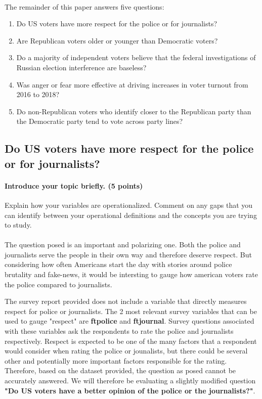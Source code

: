 \documentclass[12pt]{article}
\begin{document}
\paragraph{}
The remainder of this paper answers five questions:
\begin{enumerate}
\item Do US voters have more respect for the police or for journalists?
\item Are Republican voters older or younger than Democratic voters?
\item Do a majority of independent voters believe that the federal investigations of Russian election interference are baseless?
\item Was anger or fear more effective at driving increases in voter turnout from 2016 to 2018?
\item Do non-Republican voters who identify closer to the Republican party than the Democratic party tend to vote across party lines?
\end{enumerate}

\subsection{Do US voters have more respect for the police or for journalists?}
\paragraph{Introduce your topic briefly. (5 points)}
Explain how your variables are operationalized. Comment on any gaps that you can identify between your operational definitions and the concepts you are trying to study.

\paragraph{}
The question posed is an important and polarizing one. Both the police and journalists serve the people in their own way and therefore deserve respect. But considering how often Americans start the day with stories around police brutality and fake-news, it would be intersting to gauge how american voters rate the police compared to journalists. 

The survey report provided does not include a variable that directly measures respect for police or journalists. The 2 most relevant survey variables that can be used to gauge "respect" are \textbf{ftpolice} and \textbf{ftjournal}. Survey questions associated with these variables ask the respondents to rate the police and journalists respectively. Respect is expected to be one of the many factors that a respondent would consider when rating the police or jounalists, but there could be several other and potentially more important factors responsible for the rating. Therefore, based on the dataset provided, the question as posed cannot be accurately answered. We will therefore be evaluating a slightly modified question \textbf{"Do US voters have a better opinion of the police or the journalists?"}.
\end{document}
